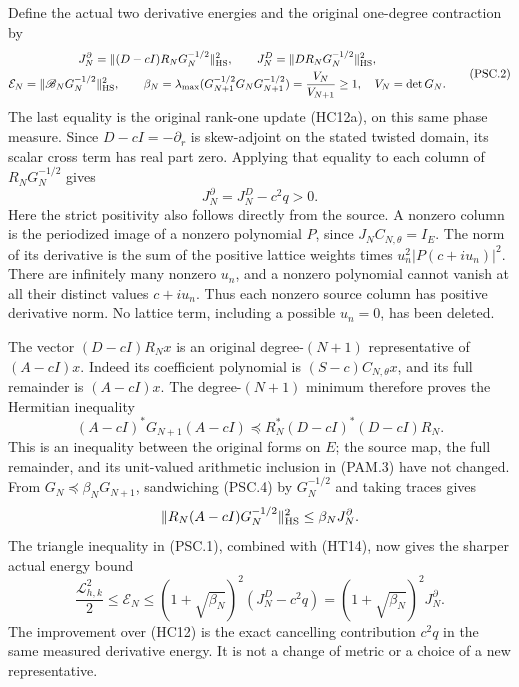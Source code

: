Define the actual two derivative energies and the original
one-degree contraction by
\[
 \begin{gathered}
 J_N^\partial=\|(D-cI)R_NG_N^{-1/2}\|_{\rm HS}^2,\qquad
 J_N^D=\|DR_NG_N^{-1/2}\|_{\rm HS}^2,\\
 \mathcal E_N=\|\mathscr B_NG_N^{-1/2}\|_{\rm HS}^2,\qquad
 \beta_N=\lambda_{\max}
       (G_{N+1}^{-1/2}G_NG_{N+1}^{-1/2})
       =\frac{V_N}{V_{N+1}}\ge1,\quad V_N=\det G_N .
 \end{gathered}
 \tag{PSC.2}\label{eq:psc-energies}
\]
The last equality is the original rank-one update (HC12a), on this
same phase measure. Since \(D-cI=-\partial_r\) is skew-adjoint
on the stated twisted domain, its scalar cross term has real part
zero. Applying that equality to each column of \(R_NG_N^{-1/2}\)
gives
\[
 J_N^\partial=J_N^D-c^2q>0 .
 \tag{PSC.3}\label{eq:psc-cancellation}
\]
Here the strict positivity also follows directly from the source.
A nonzero column is the periodized image of a nonzero polynomial
\(P\), since \(J_NC_{N,\theta}=I_E\).
The norm of its derivative is the sum of the positive lattice
weights times \(u_n^2|P(c+iu_n)|^2\).
There are infinitely many nonzero \(u_n\), and a nonzero polynomial
cannot vanish at all their distinct values \(c+iu_n\).
Thus each nonzero source column has positive derivative norm.
No lattice term, including a possible \(u_n=0\), has been deleted.

The vector \((D-cI)R_Nx\) is an original degree-\((N+1)\)
representative of \((A-cI)x\). Indeed its coefficient polynomial
is \((S-c)C_{N,\theta}x\), and its full remainder is
\((A-cI)x\). The degree-\((N+1)\) minimum therefore proves the
Hermitian inequality
\[
 (A-cI)^*G_{N+1}(A-cI)
 \preceq R_N^*(D-cI)^*(D-cI)R_N .
 \tag{PSC.4}\label{eq:psc-minimum}
\]
This is an inequality between the original forms on \(E\);
the source map, the full remainder, and its unit-valued arithmetic
inclusion in (PAM.3) have not changed.
From \(G_N\preceq\beta_NG_{N+1}\), sandwiching (PSC.4) by
\(G_N^{-1/2}\) and taking traces gives
\[
 \|R_N(A-cI)G_N^{-1/2}\|_{\rm HS}^2
 \le\beta_NJ_N^\partial.
\]
The triangle inequality in (PSC.1), combined with (HT14), now gives
the sharper actual energy bound
\[
 \boxed{\quad
 \frac{\mathcal L_{h,k}^2}{2}
 \le\mathcal E_N
 \le(1+\sqrt{\beta_N})^2
           (J_N^D-c^2q)
 =(1+\sqrt{\beta_N})^2J_N^\partial .
 \quad}
 \tag{PSC.5}\label{eq:psc-sharperenergy}
\]
The improvement over (HC12) is the exact cancelling contribution
\(c^2q\) in the same measured derivative energy. It is not a
change of metric or a choice of a new representative.

